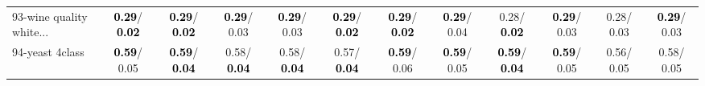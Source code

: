 \begin{table}[h]
\begin{center}
{\begin{tabular}{lc|c|c|c|c|c|c|c|c|c|c}
93-wine quality white... & \textcolor{black}{\textbf{  0.29}}/\textcolor{black}{\textbf{  0.02}} & \textcolor{black}{\textbf{  0.29}}/\textcolor{black}{\textbf{  0.02}} & \textcolor{black}{\textbf{  0.29}}/  0.03 & \textcolor{black}{\textbf{  0.29}}/  0.03 & \textcolor{black}{\textbf{  0.29}}/\textcolor{black}{\textbf{  0.02}} & \textcolor{black}{\textbf{  0.29}}/\textcolor{black}{\textbf{  0.02}} & \textcolor{black}{\textbf{  0.29}}/  0.04 &   0.28/\textcolor{black}{\textbf{  0.02}} & \textcolor{black}{\textbf{  0.29}}/  0.03 &   0.28/  0.03 & \textcolor{black}{\textbf{  0.29}}/  0.03 \\
94-yeast 4class & \textcolor{black}{\textbf{  0.59}}/  0.05 & \textcolor{black}{\textbf{  0.59}}/\textcolor{black}{\textbf{  0.04}} &   0.58/\textcolor{black}{\textbf{  0.04}} &   0.58/\textcolor{black}{\textbf{  0.04}} &   0.57/\textcolor{black}{\textbf{  0.04}} & \textcolor{black}{\textbf{  0.59}}/  0.06 & \textcolor{black}{\textbf{  0.59}}/  0.05 & \textcolor{black}{\textbf{  0.59}}/\textcolor{black}{\textbf{  0.04}} & \textcolor{black}{\textbf{  0.59}}/  0.05 &   0.56/  0.05 &   0.58/  0.05 \\\end{tabular}}\label{stratsBalAcc2bCIELM}
\end{center}
\end{table}